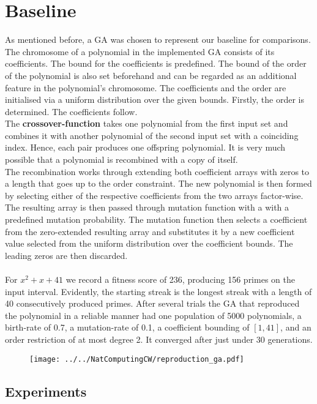 \documentclass[11pt,a4paper]{article}
\begin{document}
\section*{Baseline}
As mentioned before, a GA was chosen to represent our baseline for comparisons. \\
The chromosome of a polynomial in the implemented GA consists of its coefficients. The bound for the coefficients is predefined. The bound of the order of the polynomial is also set beforehand and can be regarded as an additional feature in the polynomial's chromosome. The coefficients and the order are initialised via a uniform distribution over the given bounds. Firstly, the order is determined. The coefficients follow. \\
The {\bf crossover-function} takes one polynomial from the first input set and combines it with another polynomial of the second input set with a coinciding index. Hence, each pair produces one offspring polynomial. It is very much possible that a polynomial is recombined with a copy of itself. \\
The recombination works through extending both coefficient arrays with zeros to a length that goes up to the order constraint. The new polynomial is then formed by selecting either of the respective coefficients from the two arrays factor-wise. \\
The resulting array is then passed through mutation function with a with a predefined mutation probability. The mutation function then selects a coefficient from the zero-extended resulting array and substitutes it by a new coefficient value selected from the uniform distribution over the coefficient bounds. The leading zeros are then discarded. \\ \\
For $x^2+x+41$ we record a fitness score of 236, producing 156 primes on the input interval. Evidently, the starting streak is the longest streak with a length of 40 consecutively produced primes. After several trials the GA that reproduced the polynomial in a reliable manner had one population of 5000 polynomials, a birth-rate of 0.7, a mutation-rate of 0.1, a coefficient bounding of $[1, 41]$, and an order restriction of at most degree 2. It converged after just under 30 generations.
\begin{figure}[h]
\centering
\texttt{[image: ../../NatComputingCW/reproduction\_ga.pdf]} 
\end{figure}
\subsection*{Experiments}
\end{document}
